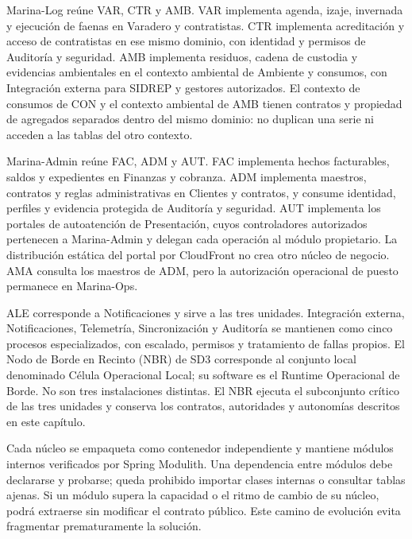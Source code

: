 Marina-Log reúne VAR, CTR y AMB. VAR implementa agenda, izaje, invernada y ejecución de faenas en Varadero y contratistas. CTR implementa acreditación y acceso de contratistas en ese mismo dominio, con identidad y permisos de Auditoría y seguridad. AMB implementa residuos, cadena de custodia y evidencias ambientales en el contexto ambiental de Ambiente y consumos, con Integración externa para SIDREP y gestores autorizados. El contexto de consumos de CON y el contexto ambiental de AMB tienen contratos y propiedad de agregados separados dentro del mismo dominio: no duplican una serie ni acceden a las tablas del otro contexto.

Marina-Admin reúne FAC, ADM y AUT. FAC implementa hechos facturables, saldos y expedientes en Finanzas y cobranza. ADM implementa maestros, contratos y reglas administrativas en Clientes y contratos, y consume identidad, perfiles y evidencia protegida de Auditoría y seguridad. AUT implementa los portales de autoatención de Presentación, cuyos controladores autorizados pertenecen a Marina-Admin y delegan cada operación al módulo propietario. La distribución estática del portal por CloudFront no crea otro núcleo de negocio. AMA consulta los maestros de ADM, pero la autorización operacional de puesto permanece en Marina-Ops.

ALE corresponde a Notificaciones y sirve a las tres unidades. Integración externa, Notificaciones, Telemetría, Sincronización y Auditoría se mantienen como cinco procesos especializados, con escalado, permisos y tratamiento de fallas propios. El Nodo de Borde en Recinto (NBR) de SD3 corresponde al conjunto local denominado Célula Operacional Local; su software es el Runtime Operacional de Borde. No son tres instalaciones distintas. El NBR ejecuta el subconjunto crítico de las tres unidades y conserva los contratos, autoridades y autonomías descritos en este capítulo.

Cada núcleo se empaqueta como contenedor independiente y mantiene módulos internos verificados por Spring Modulith. Una dependencia entre módulos debe declararse y probarse; queda prohibido importar clases internas o consultar tablas ajenas. Si un módulo supera la capacidad o el ritmo de cambio de su núcleo, podrá extraerse sin modificar el contrato público. Este camino de evolución evita fragmentar prematuramente la solución.

